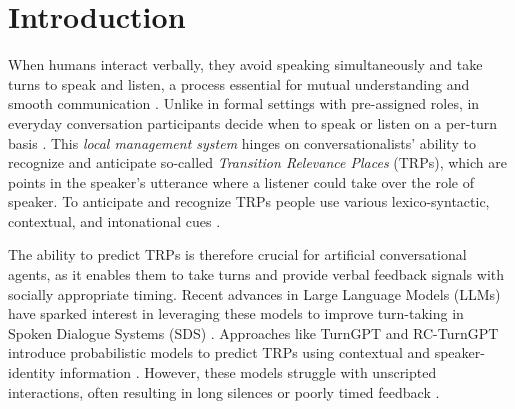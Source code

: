 

\newcommand{\turn}{U}
\newcommand{\word}[1]{w_{#1}}
\newcommand{\rword}[1]{\tilde{w}_{#1}}
\newcommand{\turnLen}{N}
\newcommand{\respLen}{M}
\newcommand{\prefix}[1]{P_{#1}}
\newcommand{\prefixes}{\mathcal{P}_\stimulus}
\newcommand{\TRP}[1]{T_{#1}}
\newcommand{\vocab}{L}
\newcommand{\TRPs}{\mathcal{T}_{\response, \stimulus}}
\newcommand{\TRPsPrediction}{\TRPs^{Predicted}}
\newcommand{\TRPsParticipants}{\TRPs^{Participants}}
\newcommand{\stimulus}{S}
\newcommand{\response}{R}
\newcommand{\wordStart}[1]{t_{\word{#1}}^s}
\newcommand{\wordEnd}[1]{t_{\word{#1}}^e}
\newcommand{\wordMid}[1]{t_{\word{#1}}^m}
\newcommand{\rwordStart}[1]{t_{\rword{#1}}^s}
\newcommand{\rwordEnd}[1]{t_{\rword{#1}}^e}
\newcommand{\rwordMid}[1]{t_{\rword{#1}}^m}
\newcommand{\interval}[2]{I_{#1#2}}
\newcommand{\intervals}[1]{\mathcal{I}_{#1}}
\newcommand{\intervalProportion}[2]{\interval{#1}{#2}^{Proportion}}
\newcommand{\participant}[1]{a_{#1}}
\newcommand{\participants}{A}
\newcommand{\Distance}{\mathcal{D}_{\stimulus}}





\section{Introduction}
\label{sec:intro}

When humans interact verbally, they avoid speaking simultaneously and take turns to speak and listen, a process essential for mutual understanding and smooth communication \citep{stivers2009universals, deRuiter2019TurnTaking}. Unlike in formal settings with pre-assigned roles, in everyday conversation participants decide when to speak or listen on a per-turn basis \citep*{sacks1974simplest}. This \textit{local management system} hinges on conversationalists' ability to recognize and anticipate so-called \textit{Transition Relevance Places} (TRPs), which are points in the speaker's utterance where a listener could take over the role of speaker. To anticipate and recognize TRPs people use various lexico-syntactic, contextual, and intonational cues \citep{deRuiter2006ProjectingTheEnd, boegels2021cues}.

The ability to predict TRPs is therefore crucial for artificial conversational agents, as it enables them to take turns and provide verbal feedback signals with socially appropriate timing. Recent advances in Large Language Models (LLMs) have sparked interest in leveraging these models to improve turn-taking in Spoken Dialogue Systems (SDS) \citep{Ni2021RecentAI}. Approaches like TurnGPT and RC-TurnGPT introduce probabilistic models to predict TRPs using contextual and speaker-identity information \citep{ekstedt2020turngpt, jiang-etal-2023-response}. However, these models struggle with unscripted interactions, often resulting in long silences or poorly timed feedback \cite{skantze2021turnreview}.

